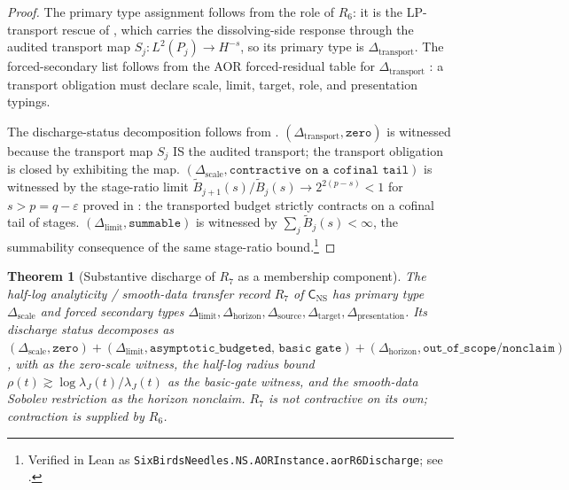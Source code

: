 \documentclass[11pt]{article}
\newcommand{\eps}{\varepsilon}
\newcommand{\lambdaJ}{\lambda_J}
\newcommand{\LPtr}{S_j}
\newtheorem{theorem}{Theorem}[section]
\theoremstyle{definition}
\begin{document}
\begin{proof}
The primary type assignment follows from the role of
\(R_6\): it is the LP-transport rescue of
, which carries the
dissolving-side response through the audited transport map
\(\LPtr\colon L^2(P_j)\to H^{-s}\), so its primary type is
\(\Delta_{\mathrm{transport}}\).  The forced-secondary list
follows from the AOR forced-residual table for
\(\Delta_{\mathrm{transport}}\) \citep{Tsiokos2026AOR}: a
transport obligation must declare scale, limit, target, role,
and presentation typings.

The discharge-status decomposition follows from
.
\((\Delta_{\mathrm{transport}},\texttt{zero})\) is witnessed
because the transport map \(\LPtr\) IS the audited transport;
the transport obligation is closed by exhibiting the map.
\((\Delta_{\mathrm{scale}},\texttt{contractive on a cofinal
tail})\) is witnessed by the stage-ratio limit
\(\widetilde B_{j+1}(s)/\widetilde B_j(s)\to 2^{2(p-s)}<1\)
for \(s>p=q-\eps\) proved in
: the transported budget
strictly contracts on a cofinal tail of stages.
\((\Delta_{\mathrm{limit}},\texttt{summable})\) is witnessed
by \(\sum_j\widetilde B_j(s)<\infty\), the summability
consequence of the same stage-ratio bound.\footnote{Verified in Lean as \texttt{SixBirdsNeedles.NS.AORInstance.aorR6Discharge}; see .}
\end{proof}

\begin{theorem}[Substantive discharge of $R_7$ as a membership component]\label{thm:ns:aor-r7-discharge}
The half-log analyticity / smooth-data transfer record $R_7$ of $\mathsf C_{\mathrm{NS}}$ has primary type $\Delta_{\mathrm{scale}}$ and forced secondary types $\Delta_{\mathrm{limit}},\Delta_{\mathrm{horizon}},\Delta_{\mathrm{source}},\Delta_{\mathrm{target}},\Delta_{\mathrm{presentation}}$.  Its discharge status decomposes as $(\Delta_{\mathrm{scale}},\texttt{zero})+(\Delta_{\mathrm{limit}},\texttt{asymptotic\_budgeted, basic gate})+(\Delta_{\mathrm{horizon}},\texttt{out\_of\_scope/nonclaim})$, with  as the zero-scale witness, the half-log radius bound $\rho(t)\gtrsim\log\lambdaJ(t)/\lambdaJ(t)$ as the basic-gate witness, and the smooth-data Sobolev restriction as the horizon nonclaim.  $R_7$ is not contractive on its own; contraction is supplied by $R_6$.
\end{theorem}
\end{document}
